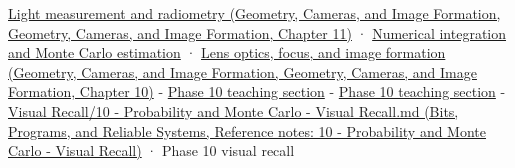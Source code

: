 \href{../03-Geometry-Cameras-and-Image-Formation/main.pdf\#nameddest=03-visual-computing-i-ch004-light-measurement-and-radiometry}{Light measurement and radiometry (Geometry, Cameras, and Image Formation, Geometry, Cameras, and Image Formation, Chapter 11)} · \hyperref[03-visual-computing-i-ch012-numerical-integration-and-monte-carlo-estimation]{Numerical integration and Monte Carlo estimation} · \href{../03-Geometry-Cameras-and-Image-Formation/main.pdf\#nameddest=03-visual-computing-i-ch003-lens-optics-focus-and-image-formation}{Lens optics, focus, and image formation (Geometry, Cameras, and Image Formation, Geometry, Cameras, and Image Formation, Chapter 10)} - \hyperref[02-foundations-ii-ch023-random-quantities-and-their-probability-laws]{Phase 10 teaching section} - \hyperref[02-foundations-ii-ch029-transformations-turn-simple-inputs-into-useful-samples]{Phase 10 teaching section} - \href{../01-Bits-Programs-and-Reliable-Systems/main.pdf\#nameddest=appendix-cb5af353ef77}{Visual Recall/10 - Probability and Monte Carlo - Visual Recall.md (Bits, Programs, and Reliable Systems, Reference notes: 10 - Probability and Monte Carlo - Visual Recall)} · Phase 10 visual recall

